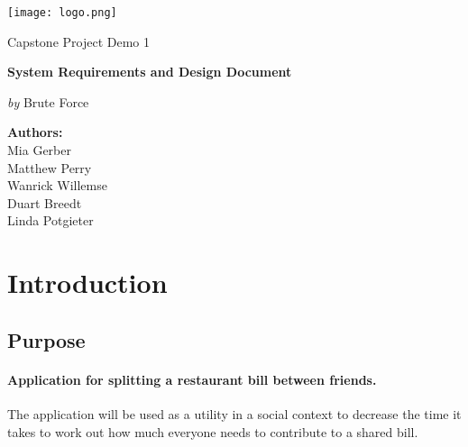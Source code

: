 \documentclass[12pt,a4paper]{article}
\begin{document}
   \begin{titlepage}
      {\selectfont
      	\centering
      	\texttt{[image: logo.png]}\par\vspace{1cm}
      	{\LARGE Capstone Project Demo 1 \par}
      	\vspace{0.25cm}
      	{\huge\bfseries \color{cyan}System Requirements and Design Document\par}
      	\vspace{1cm}
      	{\Large\textit{by} Brute Force\par}
         \vspace{0.25cm}

         \par\vspace{1cm}
         \date{}
         \author{}
         \title{}
         \centering
         \textbf{Authors:}\\
         Mia Gerber\\
         Matthew Perry\\
         Wanrick Willemse\\
         Duart Breedt\\
         Linda Potgieter\\
      }
   \end{titlepage}
   \maketitle
   \tableofcontents
   \newpage

   \section{Introduction}
   	\subsection{Purpose}
		\paragraph{Application for splitting a restaurant bill between friends.}
		The application will be used as a utility in a social context to decrease the time it takes to work out how much everyone needs to contribute to a shared bill.
\end{document}
